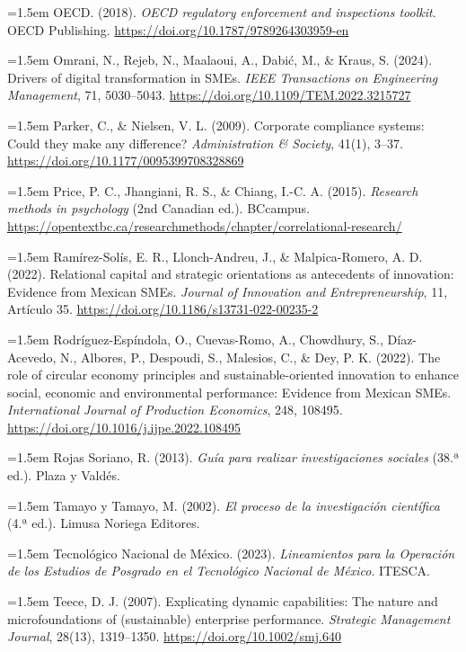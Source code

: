 {\hangindent=1.5em OECD. (2018). \textit{OECD regulatory enforcement and inspections toolkit}. OECD Publishing. \url{https://doi.org/10.1787/9789264303959-en}

\hangindent=1.5em Omrani, N., Rejeb, N., Maalaoui, A., Dabić, M., \& Kraus, S. (2024). Drivers of digital transformation in SMEs. \textit{IEEE Transactions on Engineering Management}, 71, 5030--5043. \url{https://doi.org/10.1109/TEM.2022.3215727}

\hangindent=1.5em Parker, C., \& Nielsen, V. L. (2009). Corporate compliance systems: Could they make any difference? \textit{Administration \& Society}, 41(1), 3--37. \url{https://doi.org/10.1177/0095399708328869}

\hangindent=1.5em Price, P. C., Jhangiani, R. S., \& Chiang, I.-C. A. (2015). \textit{Research methods in psychology} (2nd Canadian ed.). BCcampus. \url{https://opentextbc.ca/researchmethods/chapter/correlational-research/}

\hangindent=1.5em Ramírez-Solís, E. R., Llonch-Andreu, J., \& Malpica-Romero, A. D. (2022). Relational capital and strategic orientations as antecedents of innovation: Evidence from Mexican SMEs. \textit{Journal of Innovation and Entrepreneurship}, 11, Artículo 35. \url{https://doi.org/10.1186/s13731-022-00235-2}

\hangindent=1.5em Rodríguez-Espíndola, O., Cuevas-Romo, A., Chowdhury, S., Díaz-Acevedo, N., Albores, P., Despoudi, S., Malesios, C., \& Dey, P. K. (2022). The role of circular economy principles and sustainable-oriented innovation to enhance social, economic and environmental performance: Evidence from Mexican SMEs. \textit{International Journal of Production Economics}, 248, 108495. \url{https://doi.org/10.1016/j.ijpe.2022.108495}

\hangindent=1.5em Rojas Soriano, R. (2013). \textit{Guía para realizar investigaciones sociales} (38.ª ed.). Plaza y Valdés.

\hangindent=1.5em Tamayo y Tamayo, M. (2002). \textit{El proceso de la investigación científica} (4.ª ed.). Limusa Noriega Editores.

\hangindent=1.5em Tecnológico Nacional de México. (2023). \textit{Lineamientos para la Operación de los Estudios de Posgrado en el Tecnológico Nacional de México}. ITESCA.

\hangindent=1.5em Teece, D. J. (2007). Explicating dynamic capabilities: The nature and microfoundations of (sustainable) enterprise performance. \textit{Strategic Management Journal}, 28(13), 1319--1350. \url{https://doi.org/10.1002/smj.640}

}
